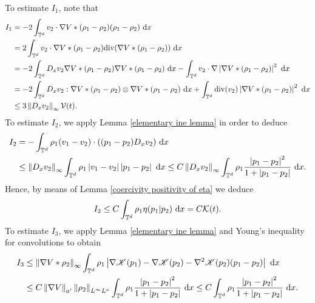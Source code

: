 \documentclass[11pt,reqno]{amsart}
\numberwithin{equation}{section}
\def\dd{{\rm d}}
\begin{document}
To estimate $I_{1}$, note that 
\begin{align}
I_{1}&=-2\int_{\mathbb{T}^{d}} v_{2}\cdot \nabla V\ast (\rho_{1}-\rho_{2})(\rho_{1}-\rho_{2})\ \dd x \notag\\
&=2\int_{\mathbb{T}^{d}} v_{2}\cdot \nabla V\ast (\rho_{1}-\rho_{2})\mathrm{div}(\nabla V\ast (\rho_{1}-\rho_{2}))\ \dd x \notag\\
&=-2\int_{\mathbb{T}^{d}}D_{x}v_{2}\nabla V\ast(\rho_{1}-\rho_{2})\nabla V\ast (\rho_{1}-\rho_{2})\ \dd x-\int_{\mathbb{T}^{d}}v_{2}\cdot \nabla \left\vert \nabla V\ast(\rho_{1}-\rho_{2})\right\vert^{2}\ \dd x \notag
\\
&= -2\int_{\mathbb{T}^{d}}D_{x}v_{2}:\nabla V\ast (\rho_{1}-\rho_{2})\otimes \nabla V\ast (\rho_{1}-\rho_{2})\ \dd x+\int_{\mathbb{T}^{d}}\mathrm{div}(v_{2})\left\vert \nabla V\ast (\rho_{1}-\rho_{2})\right\vert^{2}\ \dd x \notag
\\ &\leq 3\left\Vert D_{x}v_{2}\right\Vert_{\infty} \mathcal{V}(t).    \label{I1EST MODULATED ENERGY}
\end{align}
To estimate $I_{2}$, we apply Lemma \ref{elementary ine lemma} in order to deduce   
\begin{align}
I_{2}&=-\int_{\mathbb{T}^
{d}} \rho_{1}(v_{1}-v_{2})\cdot((p_{1}-p_{2})D_{x}v_{2})\ \dd x \notag\\
&\leq \left\Vert D_{x}v_{2}\right\Vert_{\infty}\int_{\mathbb{T}^{d}}\rho_{1}\left\vert v_{1}-v_{2}\right\vert\left\vert p_{1}-p_{2}\right\vert\ \dd x
\leq C\left\Vert D_{x}v_{2}\right\Vert_{\infty} \int_{\mathbb{T}^{d}}\rho_{1}\frac{\left\vert p_{1}-p_{2}\right\vert^{2}}{1+\left\vert p_{1}-p_{2}\right\vert}\ \dd x. \notag 
\end{align}
Hence, by means of Lemma \ref{coercivity positivity of eta} we deduce 
\begin{align}
I_{2}\leq C\int_{\mathbb{T}^{d}}\rho_{1}\eta(p_{1}\vert p_{2})\ \dd x=C\mathcal{K}(t). \label{I2 est weak strong}      
\end{align}
To estimate $I_{3}$, we apply Lemma \ref{elementary ine lemma} and Young's inequality for convolutions to obtain 
\begin{align*}
I_{3}&\leq \left\Vert \nabla V\ast \rho_{2}\right\Vert_{\infty} \int_{\mathbb{T}^{d}}\rho_{1}\left\vert \nabla \mathscr{K}(p_{1})-\nabla \mathscr{K}(p_{2})-\nabla^{2}\mathscr{K}(p_{2})(p_{1}-p_{2})\right\vert\ \dd x\\
&\leq C\left\Vert \nabla V\right\Vert_{a'}\left\Vert \rho_{2}\right\Vert_{L^{\infty}L^{a}}\int_{\mathbb{T}^{d}} \rho_{1}\frac{\left\vert p_{1}-p_{2}\right\vert^{2}}{1+\left\vert p_{1}-p_{2}\right\vert}\ \dd x\leq C\int_{\mathbb{T}^{d}}\rho_{1}\frac{\left\vert p_{1}-p_{2}\right\vert^{2}}{1+\left\vert p_{1}-p_{2}\right\vert}\ \dd x. 
\end{align*}
\end{document}
